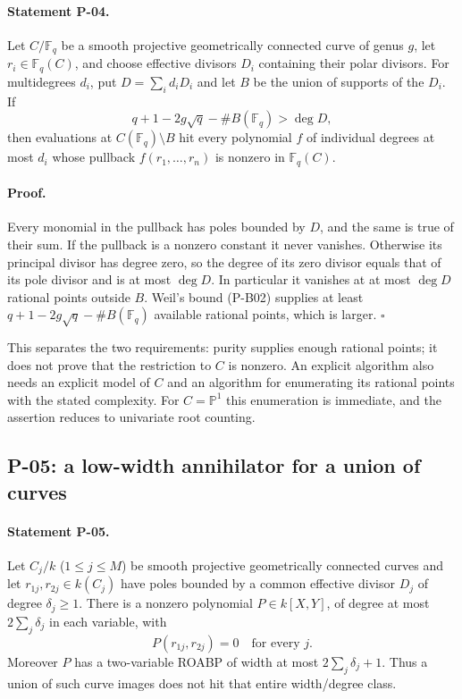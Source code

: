 \paragraph{Statement P-04.}
Let $C/\mathbb F_q$ be a smooth projective geometrically connected curve of genus $g$, let $r_i\in\mathbb F_q(C)$, and choose effective divisors $D_i$ containing their polar divisors. For multidegrees $d_i$, put $D=\sum_i d_iD_i$ and let $B$ be the union of supports of the $D_i$. If
\[
 q+1-2g\sqrt q-\#B(\mathbb F_q)>\deg D,
\]
then evaluations at $C(\mathbb F_q)\setminus B$ hit every polynomial $f$ of individual degrees at most $d_i$ whose pullback $f(r_1,\ldots,r_n)$ is nonzero in $\mathbb F_q(C)$.
\paragraph{Proof.}
Every monomial in the pullback has poles bounded by $D$, and the same is true of their sum. If the pullback is a nonzero constant it never vanishes. Otherwise its principal divisor has degree zero, so the degree of its zero divisor equals that of its pole divisor and is at most $\deg D$. In particular it vanishes at at most $\deg D$ rational points outside $B$. Weil's bound (P-B02) supplies at least $q+1-2g\sqrt q-\#B(\mathbb F_q)$ available rational points, which is larger. $\square$

This separates the two requirements: purity supplies enough rational points; it does not prove that the restriction to $C$ is nonzero. An explicit algorithm also needs an explicit model of $C$ and an algorithm for enumerating its rational points with the stated complexity. For $C=\mathbb P^1$ this enumeration is immediate, and the assertion reduces to univariate root counting.

\subsection{P-05: a low-width annihilator for a union of curves}
\paragraph{Statement P-05.}
Let $C_j/k$ ($1\le j\le M$) be smooth projective geometrically connected curves and let $r_{1j},r_{2j}\in k(C_j)$ have poles bounded by a common effective divisor $D_j$ of degree $\delta_j\ge1$. There is a nonzero polynomial $P\in k[X,Y]$, of degree at most $2\sum_j\delta_j$ in each variable, with
\[
 P(r_{1j},r_{2j})=0\quad\text{for every }j.
\]
Moreover $P$ has a two-variable ROABP of width at most $2\sum_j\delta_j+1$. Thus a union of such curve images does not hit that entire width/degree class.
